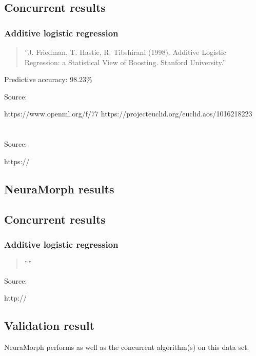 \documentclass[8pt, a4paper]{article}
\begin{document}


\subsection{Concurrent results}

\subsubsection{Additive logistic regression}

\begin{quote}
''J. Friedman, T. Hastie, R. Tibshirani (1998). Additive Logistic Regression: a Statistical View of Boosting. Stanford University.''
\end{quote}

Predictive accuracy: 98.23\%

Source:

https://www.openml.org/f/77
https://projecteuclid.org/euclid.aos/1016218223






\newpage
\section{}

Source: 

https://

\subsection{NeuraMorph results}

%

\subsection{Concurrent results}

\subsubsection{Additive logistic regression}

\begin{quote}
''''
\end{quote}

Source:

http://

\subsection{Validation result}

NeuraMorph performs as well as the concurrent algorithm(s) on this data set.
\end{document}
